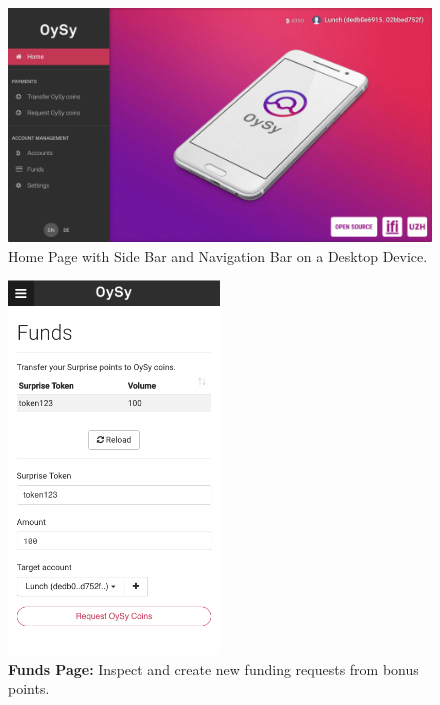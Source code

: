 \begin{figure}
\centering
\includegraphics[width=1\textwidth]{screenshots/Home1.png}
\caption{\label{fig:uihome}Home Page with Side Bar and Navigation Bar on a Desktop Device.}
\end{figure}



\begin{figure}
\centering
\includegraphics[width=0.5\textwidth]{screenshots/Funds-1.png}
\caption{\label{fig:uifunds1}\textbf{Funds Page:} Inspect and create new funding requests from bonus points.}
\end{figure}

